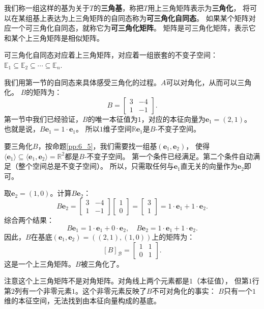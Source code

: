 \documentclass[12pt,UTF8]{ctexbook}
\begin{document}
我们称一组这样的基为关于$T$的\textbf{三角基}，称把$T$用上三角矩阵表示为\textbf{三角化}，
将可以在某组基上表达为上三角矩阵的自同态称为\textbf{可三角化自同态}。
如果某个矩阵对应一个可三角化自同态，就称它为\textbf{可三角化矩阵}。
矩阵是可三角化矩阵，表示它和某个上三角矩阵是相似矩阵。

可三角化自同态对应着上三角矩阵，对应着一组嵌套的不变子空间：$\mathbb{E}_1 \subseteq \mathbb{E}_2 \subseteq \cdots \subseteq \mathbb{E}_n$.

我们用第一节的自同态来具体感受三角化的过程。$A$可以对角化，从而可以三角化。
$B$的矩阵为：
$$
B = \begin{bmatrix} 3 & -4 \\ 1 & -1 \end{bmatrix}.
$$
第一节中我们已经验证，$B$的唯一本征值为$1$，对应的本征向量为$\mathbf{e}_1 = (2,1)$。
也就是说，$B\mathbf{e}_1 = 1 \cdot \mathbf{e}_1$。
所以$1$维子空间$\mathbb{R} \mathbf{e}_1$是$B$-不变子空间。

要三角化$B$，按命题\ref{pp:6_5}，我们需要找一组基$(\mathbf{e}_1, \mathbf{e}_2)$，
使得$\langle \mathbf{e}_1 \rangle \subseteq \langle \mathbf{e}_1, \mathbf{e}_2 \rangle = \mathbb{R}^2$都是$B$-不变子空间。
第一个条件已经满足。第二个条件自动满足（整个空间总是不变子空间）。
所以，只需取任何与$\mathbf{e}_1$直无关的向量作为$\mathbf{e}_2$即可。

取$\mathbf{e}_2 = (1, 0)$。计算$B\mathbf{e}_2$：
$$
B\mathbf{e}_2 = \begin{bmatrix} 3 & -4 \\ 1 & -1 \end{bmatrix}\begin{bmatrix} 1 \\ 0 \end{bmatrix} = \begin{bmatrix} 3 \\ 1 \end{bmatrix} = 1 \cdot \mathbf{e}_1 + 1 \cdot \mathbf{e}_2.
$$
综合两个结果：
$$
B\mathbf{e}_1 = 1 \cdot \mathbf{e}_1 + 0 \cdot \mathbf{e}_2, \quad B\mathbf{e}_2 = 1 \cdot \mathbf{e}_1 + 1 \cdot \mathbf{e}_2.
$$
因此，$B$在基底$(\mathbf{e}_1, \mathbf{e}_2) = ((2,1), (1,0))$上的矩阵为：
$$
[B]_{\mathcal{B}} = \begin{bmatrix} 1 & 1 \\ 0 & 1 \end{bmatrix}.
$$
这是一个上三角矩阵。$B$被三角化了。

注意这个上三角矩阵不是对角矩阵。对角线上两个元素都是$1$（本征值），
但第$1$行第$2$列有一个非零元素$1$。这个非零元素反映了$B$不可对角化的事实：
$B$只有一个$1$维的本征空间，无法找到由本征向量构成的基底。
\end{document}
